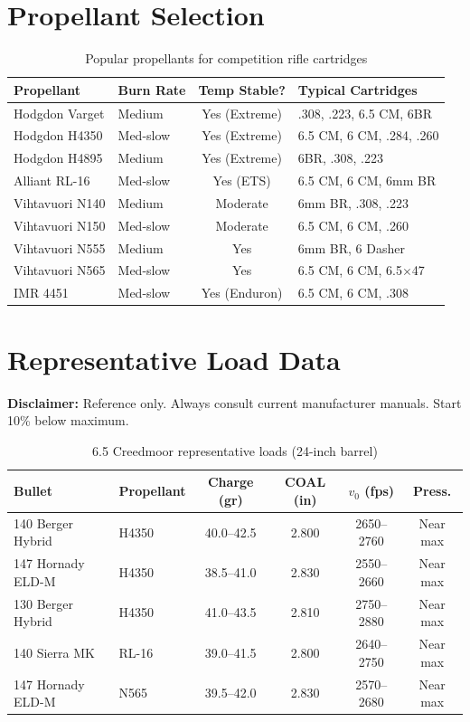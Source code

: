 \documentclass[11pt,twoside,openright]{report}
\begin{document}
\section{Propellant Selection}

\begin{table}[H]
\centering
\caption{Popular propellants for competition rifle cartridges}
\label{tab:propellants}
\small
\begin{tabularx}{\textwidth}{@{}llcX@{}}
\toprule
\textbf{Propellant} & \textbf{Burn Rate} & \textbf{Temp Stable?} & \textbf{Typical Cartridges} \\
\midrule
Hodgdon Varget & Medium & Yes (Extreme) & .308, .223, 6.5 CM, 6BR \\
Hodgdon H4350 & Med-slow & Yes (Extreme) & 6.5 CM, 6 CM, .284, .260 \\
Hodgdon H4895 & Medium & Yes (Extreme) & 6BR, .308, .223 \\
Alliant RL-16 & Med-slow & Yes (ETS) & 6.5 CM, 6 CM, 6mm BR \\
Vihtavuori N140 & Medium & Moderate & 6mm BR, .308, .223 \\
Vihtavuori N150 & Med-slow & Moderate & 6.5 CM, 6 CM, .260 \\
Vihtavuori N555 & Medium & Yes & 6mm BR, 6 Dasher \\
Vihtavuori N565 & Med-slow & Yes & 6.5 CM, 6 CM, 6.5$\times$47 \\
IMR 4451 & Med-slow & Yes (Enduron) & 6.5 CM, 6 CM, .308 \\
\bottomrule
\end{tabularx}
\end{table}

\section{Representative Load Data}

\textbf{Disclaimer:} Reference only. Always consult current manufacturer manuals. Start 10\% below maximum.

\begin{table}[H]
\centering
\caption{6.5 Creedmoor representative loads (24-inch barrel)}
\label{tab:65cm_loads}
\begin{tabular}{@{}llcccc@{}}
\toprule
\textbf{Bullet} & \textbf{Propellant} & \textbf{Charge (gr)} & \textbf{COAL (in)} & \textbf{$v_0$ (fps)} & \textbf{Press.} \\
\midrule
140 Berger Hybrid & H4350 & 40.0--42.5 & 2.800 & 2650--2760 & Near max \\
147 Hornady ELD-M & H4350 & 38.5--41.0 & 2.830 & 2550--2660 & Near max \\
130 Berger Hybrid & H4350 & 41.0--43.5 & 2.810 & 2750--2880 & Near max \\
140 Sierra MK & RL-16 & 39.0--41.5 & 2.800 & 2640--2750 & Near max \\
147 Hornady ELD-M & N565 & 39.5--42.0 & 2.830 & 2570--2680 & Near max \\
\bottomrule
\end{tabular}
\end{table}
\end{document}
